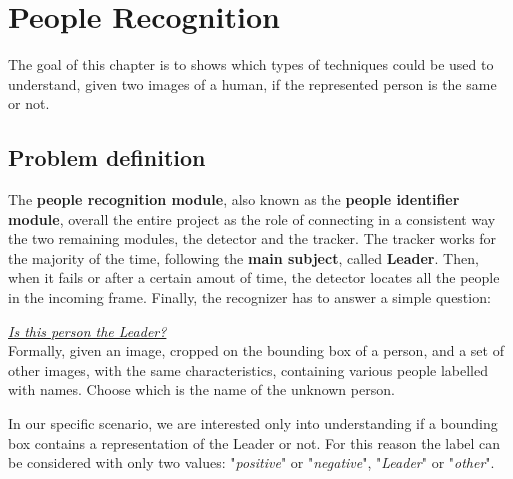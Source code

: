 \chapter{People Recognition} \label{cha:recognition}
The goal of this chapter is to shows which types of techniques could be used to understand, given two images of a human, if the represented person is the same or not.

\section{Problem definition}
The \textbf{people recognition module}, also known as the \textbf{people identifier module}, overall the entire project as the role of connecting in a consistent way the two remaining modules, the detector and the tracker. The tracker works for the majority of the time, following the \textbf{main subject}, called \textbf{Leader}. Then, when it fails or after a certain amout of time, the detector locates all the people in the incoming frame. Finally, the recognizer has to answer a simple question:
\begin{tcolorbox}
	\begin{center}
		\underline{\textit{Is this person the Leader?}}\\
		Formally, given an image, cropped on the bounding box of a person, and a set of other images, with the same characteristics, containing various people labelled with names. Choose which is the name of the unknown person.
	\end{center}
\end{tcolorbox}
In our specific scenario, we are interested only into understanding if a bounding box contains a representation of the Leader or not. For this reason the label can be considered with only two values: "\textit{positive}" or "\textit{negative}", "\textit{Leader}" or "\textit{other}".\\

